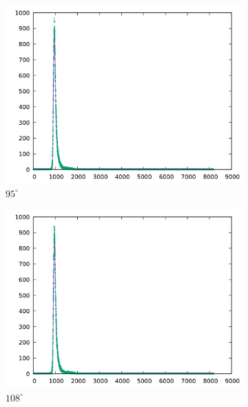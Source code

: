   \begin{figure}\ContinuedFloat
  \begin{subfigure}[h]{0.49\textwidth}
    \centering
    \includegraphics[width=\textwidth]{data/temp/na_95.png}
    \caption{$95^\circ$}
  \end{subfigure}
  \begin{subfigure}[h]{0.49\textwidth}
    \centering
    \includegraphics[width=\textwidth]{data/temp/na_108.png}
    \caption{$108^\circ$}
  \end{subfigure}
  \begin{subfigure}[h]{0.49\textwidth}
    \centering

\end{subfigure}
\end{figure}
